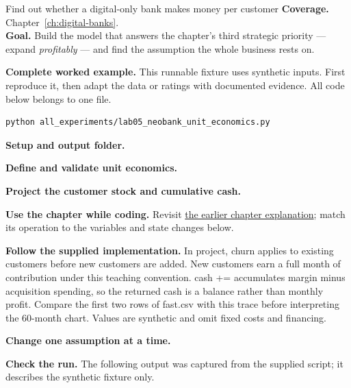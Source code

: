 
\begin{labproject}{Find out whether a digital-only bank makes money per customer}
\textbf{Coverage.} Chapter~\ref{ch:digital-banks}.\\
\textbf{Goal.} Build the model that answers the chapter's third strategic priority --- expand \emph{profitably} --- and find the assumption the whole business rests on.




\end{labproject}

\textbf{Complete worked example.} This runnable fixture uses synthetic inputs. First reproduce it, then adapt the data or ratings with documented evidence. All code below belongs to one file.
\begin{lstlisting}[style=utpterminal]
python all_experiments/lab05_neobank_unit_economics.py
\end{lstlisting}

\noindent\textbf{Setup and output folder.}


\noindent\textbf{Define and validate unit economics.}


\noindent\textbf{Project the customer stock and cumulative cash.}

\textbf{Use the chapter while coding.} Revisit \hyperref[ch:digital-banks]{the earlier chapter explanation}; match its operation to the variables and state changes below.

\textbf{Follow the supplied implementation.} In project, churn applies to existing customers before new customers are added. New customers earn a full month of contribution under this teaching convention. cash += accumulates margin minus acquisition spending, so the returned cash is a balance rather than monthly profit. Compare the first two rows of fast.csv with this trace before interpreting the 60-month chart. Values are synthetic and omit fixed costs and financing.




\noindent\textbf{Change one assumption at a time.}


\textbf{Check the run.} The following output was captured from the supplied script; it describes the synthetic fixture only.



